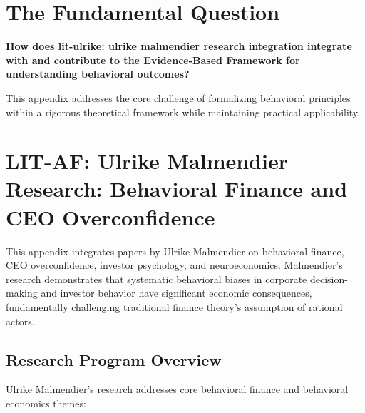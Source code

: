 \section{The Fundamental Question}
\label{sec:mal-fundamental}

\begin{tcolorbox}[
    colback=red!5!white,
    colframe=red!75!black,
    title={\textbf{Fundamental Question}}
]
\textbf{How does lit-ulrike: ulrike malmendier research integration integrate with and contribute to the
Evidence-Based Framework for understanding behavioral outcomes?}

This appendix addresses the core challenge of formalizing behavioral principles
within a rigorous theoretical framework while maintaining practical applicability.
\end{tcolorbox}





\section{LIT-AF: Ulrike Malmendier Research: Behavioral Finance and CEO Overconfidence}
\label{app:litaf}

This appendix integrates papers by Ulrike Malmendier on behavioral finance, CEO overconfidence, investor psychology, and neuroeconomics. Malmendier's research demonstrates that systematic behavioral biases in corporate decision-making and investor behavior have significant economic consequences, fundamentally challenging traditional finance theory's assumption of rational actors.

\subsection{Research Program Overview}

Ulrike Malmendier's research addresses core behavioral finance and behavioral economics themes:


